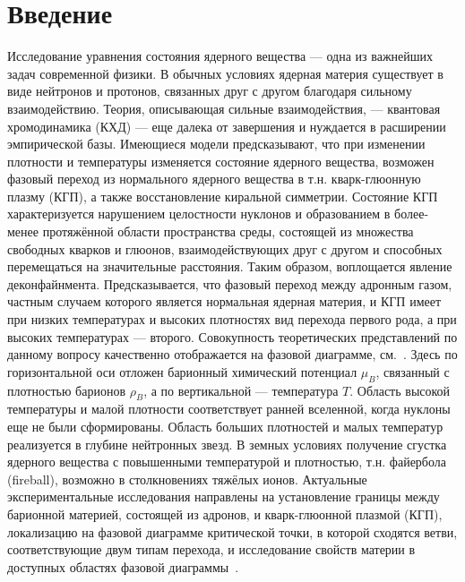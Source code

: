 \chapter*{Введение}\label{sec:secIntro}

Исследование уравнения состояния ядерного вещества --- одна из важнейших задач современной физики. В обычных условиях ядерная материя существует в виде нейтронов и протонов, связанных друг с другом благодаря сильному взаимодействию. Теория, описывающая сильные взаимодействия, --- квантовая хромодинамика (КХД) --- еще далека от завершения и нуждается в расширении эмпирической базы. Имеющиеся модели предсказывают, что при изменении плотности и температуры изменяется состояние ядерного вещества, возможен фазовый переход из нормального ядерного вещества в т.н. кварк-глюонную плазму (КГП), а также восстановление киральной симметрии. Состояние КГП характеризуется нарушением целостности нуклонов и образованием в более-менее протяжённой области пространства среды, состоящей из множества свободных кварков и глюонов, взаимодействующих друг с другом и способных перемещаться на значительные расстояния. Таким образом, воплощается явление деконфайнмента. Предсказывается, что фазовый переход между адронным газом, частным случаем которого является нормальная ядерная материя, и КГП имеет при низких температурах и высоких плотностях вид перехода первого рода, а при высоких температурах --- второго.
Совокупность теоретических представлений по данному вопросу качественно отображается на фазовой диаграмме, см.~. Здесь по горизонтальной оси отложен барионный химический потенциал $\mu_{B}$, связанный с плотностью барионов $\rho_{B}$, а по вертикальной --- температура $T$. Область высокой температуры и малой плотности соответствует ранней вселенной, когда нуклоны еще не были сформированы. Область больших плотностей и малых температур реализуется в глубине нейтронных звезд. В земных условиях получение сгустка ядерного вещества с повышенными температурой и плотностью, т.н. файербола (fireball), возможно в столкновениях тяжёлых ионов. Актуальные экспериментальные исследования направлены на установление границы между барионной материей, состоящей из адронов, и кварк-глюонной плазмой (КГП), локализацию на фазовой диаграмме критической точки, в которой сходятся ветви, соответствующие двум типам перехода, и исследование свойств материи в доступных областях фазовой диаграммы~\cite{CBMBook}.



